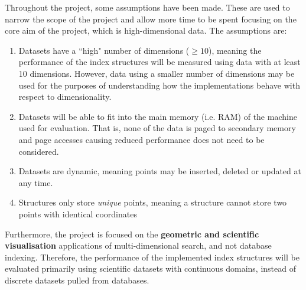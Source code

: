 Throughout the project, some assumptions have been made. These are used to narrow the scope of the project and allow more time to be spent focusing on the core aim of the project, which is high-dimensional data. The assumptions are:
\begin{enumerate}
	\item Datasets have a ``high" number of dimensions ($\geq 10$), meaning the performance of the index structures will be measured using data with at least 10 dimensions. However, data using a smaller number of dimensions may be used for the purposes of understanding how the implementations behave with respect to dimensionality.
	\item Datasets will be able to fit into the main memory (i.e. RAM) of the machine used for evaluation. That is, none of the data is paged to secondary memory and page accesses causing reduced performance does not need to be considered.
	\item Datasets are dynamic, meaning points may be inserted, deleted or updated at any time.
	\item Structures only store \textit{unique} points, meaning a structure cannot store two points with identical coordinates
\end{enumerate}

Furthermore, the project is focused on the \textbf{geometric and scientific visualisation} applications of multi-dimensional search, and not database indexing. Therefore, the performance of the implemented index structures will be evaluated primarily using scientific datasets with continuous domains, instead of discrete datasets pulled from databases.